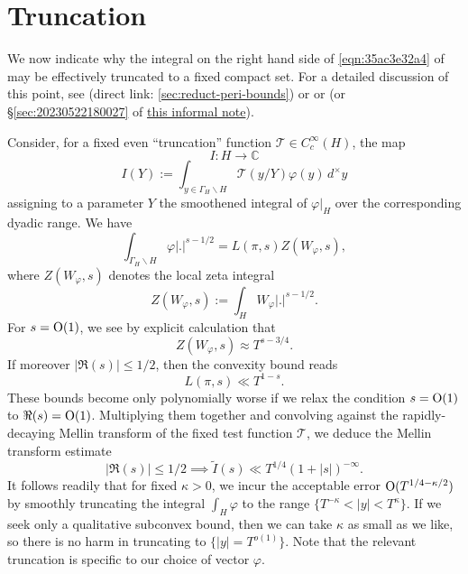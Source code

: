 \documentclass[reqno]{amsart} 
\numberwithin{equation}{section}
\numberwithin{theorem}{section}
\begin{document}
\section{Truncation}\label{sec:orgc98f847}
We now indicate why the integral on the right hand side of \eqref{eqn:35ac3e32a4} of may be effectively truncated to a fixed compact set.  For a detailed discussion of this point, see \cite[\S5.3]{2021arXiv210915230N} (direct link: \ref{sec:reduct-peri-bounds}) or \cite[\S5.1.4]{michel-2009} or \cite[\S3]{2020arXiv200406791S} (or \S\ref{sec:20230522180027} of \href{20230522T174726__shrinking-archimedean-families-second-moment-gl2.pdf}{this informal note}).

Consider, for a fixed even ``truncation'' function $\mathcal{T} \in C_c^\infty(H)$, the map
\begin{equation*}
  I : H \rightarrow \mathbb{C} 
\end{equation*}
\begin{equation*}
  I(Y) := \int _{y \in \Gamma_{H} \backslash H}  \mathcal{T}(y/Y) \varphi(y) \, d^\times y
\end{equation*}
assigning to a parameter $Y$ the smoothened integral of $\varphi|_H$ over the corresponding dyadic range.  We have
\begin{equation*}
  \int _{\Gamma_{H} \backslash H} \varphi |.|^{s-1/2} = L(\pi,s) Z(W_\varphi,s),
\end{equation*}
where $Z(W_\varphi,s)$ denotes the local zeta integral
\begin{equation*}
  Z(W_\varphi,s) := \int _{H} W_\varphi |.|^{s-1/2}.
\end{equation*}
For $s = \operatorname{O}(1)$, we see by explicit calculation that
\begin{equation*}
  Z(W_\varphi,s) \approx T^{s-3/4}.
\end{equation*}
If moreover $|\Re(s)| \leq 1/2$, then the convexity bound reads
\begin{equation*}
  L(\pi,s) \ll T^{1 - s}.
\end{equation*}
These bounds become only polynomially worse if we relax the condition $s = \operatorname{O}(1)$ to $\Re(s) = \operatorname{O}(1)$.  Multiplying them together and convolving against the rapidly-decaying Mellin transform of the fixed test function $\mathcal{T}$, we deduce the Mellin transform estimate
\begin{equation*}
|\Re(s)| \leq 1/2 \implies \tilde{I}(s) \ll T^{1/4} (1 + |s|)^{-\infty}.
\end{equation*}
It follows readily that for fixed $\kappa > 0$, we incur the acceptable error $\operatorname{O}(T^{1/4 -\kappa/2})$ by smoothly truncating the integral $\int_H \varphi$ to the range $\{T^{-\kappa} < |y| < T^{\kappa}\}$.  If we seek only a qualitative subconvex bound, then we can take $\kappa$ as small as we like, so there is no harm in truncating to $\{ |y| = T^{o(1)} \}$.  Note that the relevant truncation is specific to our choice of vector $\varphi$.
\end{document}
